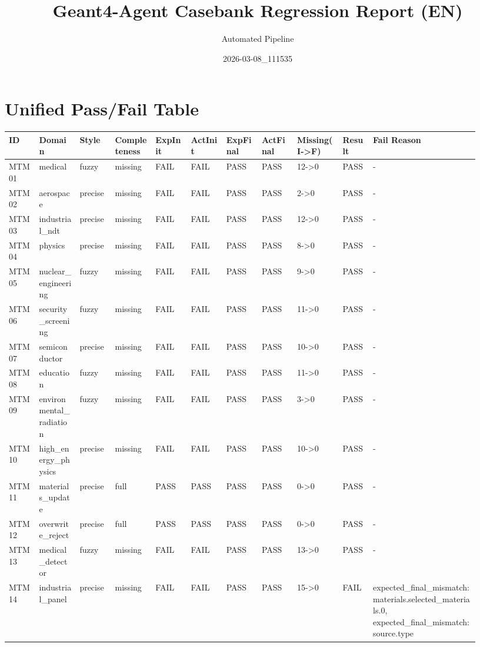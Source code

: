 \documentclass[11pt]{ctexart}
\title{Geant4-Agent Casebank Regression Report (EN)}
\author{Automated Pipeline}
\date{2026-03-08\_111535}
\begin{document}
\maketitle
\section{Unified Pass/Fail Table}
\begin{longtable}{p{0.06\linewidth}p{0.08\linewidth}p{0.07\linewidth}p{0.08\linewidth}p{0.07\linewidth}p{0.07\linewidth}p{0.07\linewidth}p{0.07\linewidth}p{0.09\linewidth}p{0.06\linewidth}p{0.21\linewidth}}
\toprule
ID & Domain & Style & Completeness & ExpInit & ActInit & ExpFinal & ActFinal & Missing(I->F) & Result & Fail Reason \\
\midrule
MTM01 & medical & fuzzy & missing & FAIL & FAIL & PASS & PASS & 12->0 & PASS & - \\
MTM02 & aerospace & precise & missing & FAIL & FAIL & PASS & PASS & 2->0 & PASS & - \\
MTM03 & industrial\_ndt & precise & missing & FAIL & FAIL & PASS & PASS & 12->0 & PASS & - \\
MTM04 & physics & precise & missing & FAIL & FAIL & PASS & PASS & 8->0 & PASS & - \\
MTM05 & nuclear\_engineering & fuzzy & missing & FAIL & FAIL & PASS & PASS & 9->0 & PASS & - \\
MTM06 & security\_screening & fuzzy & missing & FAIL & FAIL & PASS & PASS & 11->0 & PASS & - \\
MTM07 & semiconductor & precise & missing & FAIL & FAIL & PASS & PASS & 10->0 & PASS & - \\
MTM08 & education & fuzzy & missing & FAIL & FAIL & PASS & PASS & 11->0 & PASS & - \\
MTM09 & environmental\_radiation & fuzzy & missing & FAIL & FAIL & PASS & PASS & 3->0 & PASS & - \\
MTM10 & high\_energy\_physics & precise & missing & FAIL & FAIL & PASS & PASS & 10->0 & PASS & - \\
MTM11 & materials\_update & precise & full & PASS & PASS & PASS & PASS & 0->0 & PASS & - \\
MTM12 & overwrite\_reject & precise & full & PASS & PASS & PASS & PASS & 0->0 & PASS & - \\
MTM13 & medical\_detector & fuzzy & missing & FAIL & FAIL & PASS & PASS & 13->0 & PASS & - \\
MTM14 & industrial\_panel & precise & missing & FAIL & FAIL & PASS & PASS & 15->0 & FAIL & expected\_final\_mismatch:materials.selected\_materials.0, expected\_final\_mismatch:source.type \\

\end{longtable}
\end{document}
